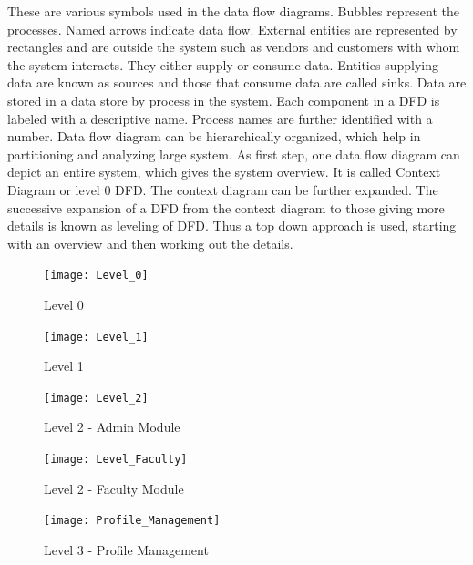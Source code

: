 These are various symbols used in the data flow diagrams. Bubbles represent the processes. Named arrows indicate data flow. External entities are represented by rectangles and are outside the system such as vendors and customers with whom the system interacts. They either supply or consume data. Entities supplying data are known as sources and those that consume data are called sinks. Data are stored in a data store by process in the system. Each component in a DFD is labeled with a descriptive name. Process names are further identified with a number. Data flow diagram can be hierarchically organized, which help in partitioning and analyzing large system. As first step, one data flow diagram can depict an entire system, which gives the system overview. It is called Context Diagram or level 0 DFD. The context diagram can be further expanded. The successive expansion of a DFD from the context diagram to those giving more details is known as leveling of DFD. Thus a top down approach is used, starting with an overview and then working out the details.



\begin{figure}[!h]
	\begin{center}
		\texttt{[image: Level\_0]}
	\end{center}
\caption{Level 0}
\end{figure}

\begin{figure}[!h]
	\begin{center}
		\texttt{[image: Level\_1]}
	\end{center}
\caption{Level 1}
\end{figure}

\begin{figure}[!h]
	\begin{center}
		\texttt{[image: Level\_2]}
	\end{center}
\caption{Level 2 - Admin Module}
\end{figure}

\begin{figure}[!h]
	\begin{center}
		\texttt{[image: Level\_Faculty]}
	\end{center}
\caption{Level 2 - Faculty Module}
\end{figure}

\begin{figure}[!h]
	\begin{center}
		\texttt{[image: Profile\_Management]}
	\end{center}
\caption{Level 3 - Profile Management}
\end{figure}

